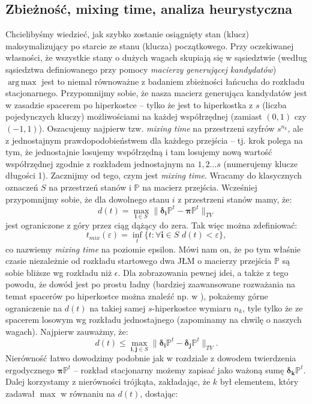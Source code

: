 \documentclass[a4paper]{article}
\DeclareMathOperator*{\argmax}{arg\,max}
\theoremstyle{defn}
\theoremstyle{theorem}
\theoremstyle{lemma}
\theoremstyle{cor}
\theoremstyle{fact}
\begin{document}
\subsection{Zbieżność, mixing time, analiza heurystyczna}
Chcielibyśmy wiedzieć, jak szybko zostanie osiągnięty stan (klucz) maksymalizujący po starcie ze stanu (klucza) początkowego. Przy oczekiwanej własności, że wszystkie stany o dużych wagach skupiają się w sąsiedztwie (według sąsiedztwa definiowanego przy pomocy \textit{macierzy generującej kandydatów}) $\argmax$ jest to niemal równoważne z badaniem zbieżności łańcucha do rozkładu stacjonarnego. Przypomnijmy sobie, że nasza macierz generująca kandydatów jest w zasadzie spacerem po hiperkostce – tylko że jest to hiperkostka z $s$ (liczba pojedynczych kluczy) możliwościami na każdej współrzędnej (zamiast $(0,1)$ czy $(-1,1)$). Oszacujemy najpierw tzw. \textit{mixing time} na przestrzeni szyfrów $s^{n_k}$, ale z jednostajnym prawdopodobieństwem dla każdego przejścia – tj. krok polega na tym, że jednostajnie losujemy współrzędną i tam losujemy nową wartość współrzędnej zgodnie z rozkładem jednostajnym na $1,2...s$ (numerujemy klucze długości 1). Zacznijmy od tego, czym jest \textit{mixing time}. Wracamy do klasycznych oznaczeń $S$ na przestrzeń stanów i $\mathbb{P}$ na macierz przejścia. Wcześniej przypomnijmy sobie, że dla dowolnego stanu $i$ z przestrzeni stanów mamy, że:
$$d(t) = \max_{\boldsymbol{i} \in S} \|\boldsymbol{\delta_i} \mathbb{P}^t - \boldsymbol{\pi} \mathbb{P}^t\|_{TV}$$
jest ograniczone z góry przez ciąg dążący do zera. Tak więc można zdefiniować:
$$ t_{mix}(\varepsilon) = \inf_t \{t: \forall \boldsymbol{i} \in S\,\, d(t) < \varepsilon\},$$
co nazwiemy \textit{mixing time} na poziomie epsilon. Mówi nam on, że po tym właśnie czasie niezależnie od rozkładu startowego dwa JŁM o macierzy przejścia $\mathbb{P}$ są sobie bliższe wg rozkładu niż $\epsilon$. Dla zobrazowania pewnej idei, a także z tego powodu, że dowód jest po prostu ładny (bardziej zaawansowane rozważania na temat spacerów po hiperkostce można znaleźć np. w \cite{mixing}), pokażemy górne ograniczenie na $d(t)$ na takiej samej $s$-hiperkostce wymiaru $n_k$, tyle tylko że ze spacerem losowym wg rozkładu jednostajnego (zapominamy na chwilę o naszych wagach). Najpierw zauważmy, że:
$$d(t) \leq \max_{\boldsymbol{i},\boldsymbol{j} \in S} \|\boldsymbol{\delta_i} \mathbb{P}^t - \boldsymbol{\delta_j} \mathbb{P}^t \|_{TV}.$$
Nierówność łatwo dowodzimy podobnie jak w rozdziale z dowodem twierdzenia ergodycznego $\boldsymbol{\pi}\mathbb{P}^t$ – rozkład stacjonarny możemy zapisać jako ważoną sumę $\boldsymbol{\delta_k} \mathbb{P}^t$. Dalej korzystamy z nierówności trójkąta, zakładając, że $k$ był elementem, który zadawał $\max$ w równaniu na $d(t)$, dostając:
\end{document}
